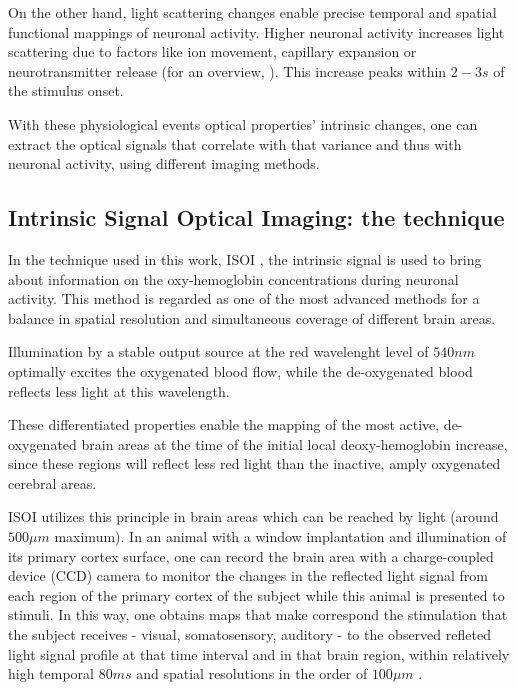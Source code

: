 On the other hand, light scattering changes enable precise temporal and spatial functional mappings of neuronal activity. Higher neuronal activity increases light scattering due to factors like ion movement, capillary expansion or neurotransmitter release (for an overview, \cite{Cohen1973}). This increase peaks within $2-3 s$ of the stimulus onset.

With these physiological events optical properties' intrinsic changes, one can extract the optical signals that correlate with that variance and thus with neuronal activity, using different imaging methods.


\subsection{Intrinsic Signal Optical Imaging: the technique}

In the technique used in this work, ISOI \cite{Grinvald1986}, the intrinsic signal is used to bring about information on the oxy-hemoglobin concentrations during neuronal activity. This method is regarded as one of the most advanced methods for a balance in spatial resolution and simultaneous coverage of different brain areas.

Illumination by a stable output source at the red wavelenght level of $540 nm$ optimally excites the oxygenated blood flow, while the de-oxygenated blood reflects less light at this wavelength. 

These differentiated properties enable the mapping of the most active, de-oxygenated brain areas at the time of the initial local deoxy-hemoglobin increase, since these regions will reflect less red light than the inactive, amply oxygenated cerebral areas.

ISOI utilizes this principle in brain areas which can be reached by light (around $500 \mu m$ maximum). In an animal with a window implantation and illumination of its primary cortex surface, one can record the brain area with a charge-coupled device (CCD) camera to monitor the changes in the reflected light signal from each region of the primary cortex of the subject while this animal is presented to stimuli. In this way, one obtains maps that make correspond the stimulation that the subject receives - visual, somatosensory, auditory - to the observed refleted light signal profile at that time interval and in that brain region, within relatively high temporal $80 ms$ \cite{Lu2017} and spatial resolutions in the order of $100 \mu m$ \cite{Grinvald1986}.

